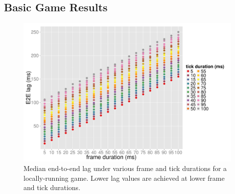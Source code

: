 \subsection{Basic Game Results}

\begin{figure}[!t]
	\centering
	\includegraphics[width=1.0\columnwidth]{../../../simulation/visualization/nwless-onlinegame-1000rounds.pdf}
	\caption{Median end-to-end lag under various frame and tick durations for a locally-running game. Lower lag values are achieved at lower frame and tick durations.}
\label{fig:nwless-scatter}
\end{figure}

